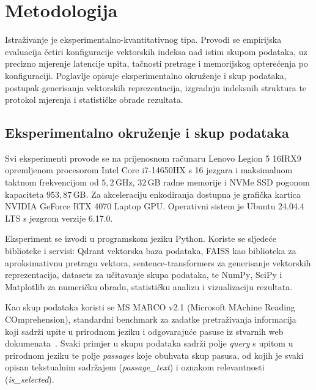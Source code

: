 \section{Metodologija}
\label{sec:metodologija}

Istraživanje je eksperimentalno-kvantitativnog tipa. Provodi se empirijska
evaluacija četiri konfiguracije vektorskih indeksa nad istim skupom podataka,
uz precizno mjerenje latencije upita, tačnosti pretrage i memorijskog
opterećenja po konfiguraciji. Poglavlje opisuje eksperimentalno okruženje
i skup podataka, postupak generisanja vektorskih reprezentacija, izgradnju
indeksnih struktura te protokol mjerenja i statističke obrade rezultata.

\subsection{Eksperimentalno okruženje i skup podataka}
\label{sec:okruzenje_podaci}

Svi eksperimenti provode se na prijenosnom računaru Lenovo Legion 5 16IRX9
opremljenom procesorom Intel Core i7-14650HX s 16 jezgara i maksimalnom
taktnom frekvencijom od $5{,}2$\,GHz, $32$\,GB radne memorije i NVMe SSD
pogonom kapaciteta $953{,}87$\,GB. Za akceleraciju enkodiranja dostupna je
grafička kartica NVIDIA GeForce RTX 4070 Laptop GPU. Operativni sistem je
Ubuntu 24.04.4 LTS s jezgrom verzije 6.17.0.

Eksperiment se izvodi u programskom jeziku Python. Koriste se sljedeće
biblioteke i servisi: \foreignlanguage{english}{Qdrant} vektorska baza
podataka,
\foreignlanguage{english}{FAISS} kao biblioteka za aproksimativnu pretragu
vektora, \foreignlanguage{english}{sentence-transformers} za generisanje
vektorskih reprezentacija, \foreignlanguage{english}{datasets} za učitavanje
skupa podataka, te \foreignlanguage{english}{NumPy},
\foreignlanguage{english}{SciPy} i
\foreignlanguage{english}{Matplotlib}
za numeričku obradu, statističku analizu i vizualizaciju rezultata.

Kao skup podataka koristi se \foreignlanguage{english}{MS MARCO v2.1}
(\foreignlanguage{english}{Microsoft MAchine Reading COmprehension}),
standardni benchmark za zadatke pretraživanja informacija koji sadrži upite
u prirodnom jeziku i odgovarajuće pasuse iz stvarnih web
dokumenata~\cite{msmarco2016}. Svaki primjer u skupu podataka sadrži polje
\emph{query} s upitom u prirodnom jeziku te polje \emph{passages} koje
obuhvata skup pasusa, od kojih je svaki opisan tekstualnim sadržajem
(\emph{passage\_text}) i oznakom relevantnosti (\emph{is\_selected}).

